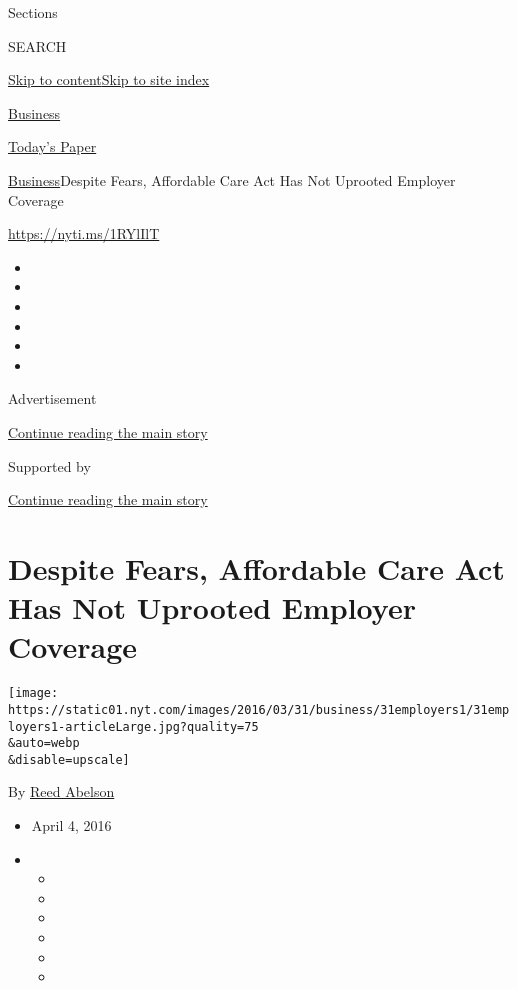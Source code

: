 Sections

SEARCH

\protect\hyperlink{site-content}{Skip to
content}\protect\hyperlink{site-index}{Skip to site index}

\href{https://www.nytimes.com/section/business}{Business}

\href{https://myaccount.nytimes.com/auth/login?response_type=cookie\&client_id=vi}{}

\href{https://www.nytimes.com/section/todayspaper}{Today's Paper}

\href{/section/business}{Business}\textbar{}Despite Fears, Affordable
Care Act Has Not Uprooted Employer Coverage

\url{https://nyti.ms/1RYlIlT}

\begin{itemize}
\item
\item
\item
\item
\item
\item
\end{itemize}

Advertisement

\protect\hyperlink{after-top}{Continue reading the main story}

Supported by

\protect\hyperlink{after-sponsor}{Continue reading the main story}

\hypertarget{despite-fears-affordable-care-act-has-not-uprooted-employer-coverage}{%
\section{Despite Fears, Affordable Care Act Has Not Uprooted Employer
Coverage}\label{despite-fears-affordable-care-act-has-not-uprooted-employer-coverage}}

\texttt{[image: https://static01.nyt.com/images/2016/03/31/business/31employers1/31employers1-articleLarge.jpg?quality=75\\\&auto=webp\\\&disable=upscale]}

By \href{http://www.nytimes.com/by/reed-abelson}{Reed Abelson}

\begin{itemize}
\item
  April 4, 2016
\item
  \begin{itemize}
  \item
  \item
  \item
  \item
  \item
  \item
  \end{itemize}
\end{itemize}

